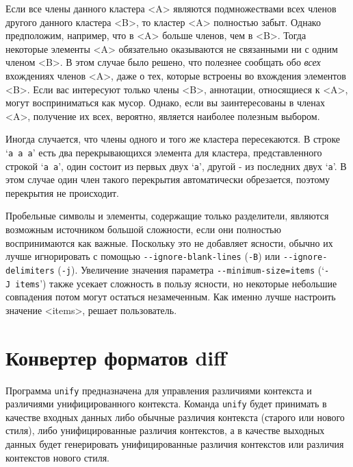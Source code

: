 \begin{description}
Если все члены данного кластера \textless A\textgreater{} являются
подмножествами всех членов другого данного кластера
\textless B\textgreater, то кластер \textless A\textgreater{} полностью
забыт. Однако предположим, например, что в \textless A\textgreater{}
больше членов, чем в \textless B\textgreater. Тогда некоторые элементы
\textless A\textgreater{} обязательно оказываются не связанными ни с
одним членом \textless B\textgreater. В этом случае было решено, что
полезнее сообщать обо \emph{всех} вхождениях членов
\textless A\textgreater, даже о тех, которые встроены во вхождения
элементов \textless B\textgreater. Если вас интересуют только члены
\textless B\textgreater, аннотации, относящиеся к
\textless A\textgreater, могут восприниматься как мусор. Однако, если вы
заинтересованы в членах \textless A\textgreater, получение их всех,
вероятно, является наиболее полезным выбором.

Иногда случается, что члены одного и того же кластера пересекаются. В
строке `\texttt{a\ a\ a}' есть два перекрывающихся элемента для
кластера, представленного строкой `\texttt{a\ a}', один состоит из
первых двух `\texttt{a}', другой - из последних двух `\texttt{a}'. В
этом случае один член такого перекрытия автоматически обрезается,
поэтому перекрытия не происходит.

Пробельные символы и элементы, содержащие только разделители, являются
возможным источником большой сложности, если они полностью
воспринимаются как важные. Поскольку это не добавляет ясности, обычно их
лучше игнорировать с помощью \texttt{-\/-ignore-blank-lines}
(\texttt{-B}) или \texttt{-\/-ignore-delimiters} (\texttt{-j}).
Увеличение значения параметра \texttt{-\/-minimum-size=items}
(`\texttt{-J\ items}') также усекает сложность в пользу ясности, но
некоторые небольшие совпадения потом могут остаться незамеченным. Как
именно лучше настроить значение \textless items\textgreater, решает
пользователь.
\end{description}

\hypertarget{unify}{%
\section{Конвертер форматов diff}\label{unify}}

Программа \texttt{unify} предназначена для управления различиями
контекста и различиями унифицированного контекста. Команда
\texttt{unify} будет принимать в качестве входных данных либо обычные
различия контекста (старого или нового стиля), либо унифицированные
различия контекстов, а в качестве выходных данных будет генерировать
унифицированные различия контекстов или различия контекстов нового
стиля.

